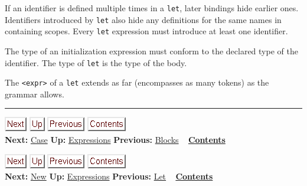 \documentclass[]{article}
\begin{document}
If an identifier is defined multiple times in a \texttt{let}, later
bindings hide earlier ones. Identifiers introduced by \texttt{let} also
hide any definitions for the same names in containing scopes. Every
\texttt{let} expression must introduce at least one identifier.

The type of an initialization expression must conform to the declared
type of the identifier. The type of \texttt{let} is the type of the
body.

The \texttt{\textless{}expr\textgreater{}} of a \texttt{let} extends as
far (encompasses as many tokens) as the grammar allows.

\begin{center}\rule{3in}{0.4pt}\end{center}

\href{node22.html}{\includegraphics{next.png}}
\href{node13.html}{\includegraphics{up.png}}
\href{node20.html}{\includegraphics{prev.png}}
\href{node1.html}{\includegraphics{contents.png}} \\ \textbf{Next:}
\href{node22.html}{Case} \textbf{Up:} \href{node13.html}{Expressions}
\textbf{Previous:} \href{node20.html}{Blocks} ~
\textbf{\href{node1.html}{Contents}}

\href{node23.html}{\includegraphics{next.png}}
\href{node13.html}{\includegraphics{up.png}}
\href{node21.html}{\includegraphics{prev.png}}
\href{node1.html}{\includegraphics{contents.png}} \\ \textbf{Next:}
\href{node23.html}{New} \textbf{Up:} \href{node13.html}{Expressions}
\textbf{Previous:} \href{node21.html}{Let} ~
\textbf{\href{node1.html}{Contents}} \\ \\
\end{document}
